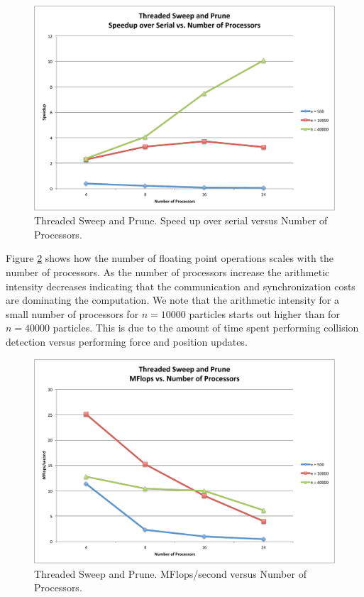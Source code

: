 \documentclass[11pt]{article} %
\begin{document}
\begin{figure}
\begin{centering}
\includegraphics[width=0.5\paperwidth]{figures/thread_speedup_v_p}
\par\end{centering}

\caption{Threaded Sweep and Prune. Speed up over serial versus Number of Processors.}
\label{plot:thread_speedup_v_p}
\end{figure}


Figure \ref{plot:thread_flops_v_p} shows how the number of floating
point operations scales with the number of processors. As the number
of processors increase the arithmetic intensity decreases indicating
that the communication and synchronization costs are dominating the
computation. We note that the arithmetic intensity for a small number
of processors for $n=10000$ particles starts out higher than for
$n=40000$ particles. This is due to the amount of time spent performing
collision detection versus performing force and position updates. 

\begin{figure}
\begin{centering}
\includegraphics[width=0.5\paperwidth]{figures/thread_flops_v_p}
\par\end{centering}

\caption{Threaded Sweep and Prune. MFlops/second versus Number of Processors.}
\label{plot:thread_flops_v_p}
\end{figure}
\end{document}
